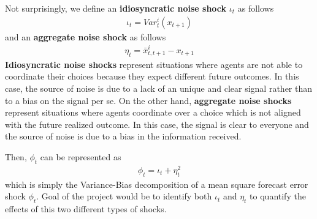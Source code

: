 \documentclass{article}
\begin{document}
{Not surprisingly, we define an \textbf{idiosyncratic noise shock} $\iota_t$ as follows
\begin{eqnarray}\label{eq:idio_shock}
\iota_t = Var^i_t(x_{t+1})
\end{eqnarray}
and an \textbf{aggregate noise shock} as follows
\begin{eqnarray}\label{eq:aggre_shock}
\eta_t = \bar{x}_{t,t+1}^i - x_{t+1}
\end{eqnarray}
\textbf{Idiosyncratic noise shocks} represent situations where agents are not able to coordinate their choices because they expect different future outcomes. In this case, the source of noise is due to a lack of an unique and clear signal rather than to a bias on the signal per se. On the other hand, \textbf{aggregate noise shocks} represent situations where agents coordinate over a choice which is not aligned with the future realized outcome. In this case, the signal is clear to everyone and the source of noise is due to a bias in the information received.

Then, $\phi_t$ can be represented as
\begin{eqnarray}\label{eq:bias_var_dec}
\phi_t = \iota_t + \eta_t^2
\end{eqnarray}
which is simply the Variance-Bias decomposition of a mean square forecast error shock $\phi_t$. Goal of the project would be to identify both $\iota_t$ and $\eta_t$ to quantify the effects of this two different types of shocks.










}
\end{document}
